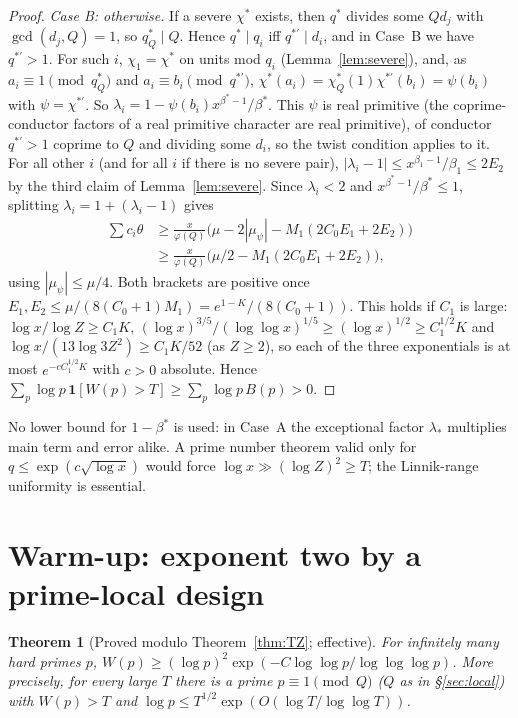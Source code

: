 \documentclass[11pt,reqno]{amsart}
\newtheorem{theorem}{Theorem}[section]
\theoremstyle{definition}
\begin{document}
\begin{proof}
\emph{Case B: otherwise.}  If a severe $\chi^*$ exists, then $q^*$ divides some
$Qd_j$ with $\gcd(d_j,Q)=1$, so $q^*_Q\mid Q$.  Hence $q^*\mid q_i$ iff
$q^{*\prime}\mid d_i$, and in Case~B we have $q^{*\prime}>1$.  For such $i$,
$\chi_1=\chi^*$ on units mod $q_i$ (Lemma~\ref{lem:severe}), and, as
$a_i\equiv1\pmod{q^*_Q}$ and $a_i\equiv b_i\pmod{q^{*\prime}}$,
$\chi^*(a_i)=\chi^*_Q(1)\chi^{*\prime}(b_i)=\psi(b_i)$ with $\psi=\chi^{*\prime}$.  So
$\lambda_i=1-\psi(b_i)x^{\beta^*-1}/\beta^*$.  This $\psi$ is real primitive (the
coprime-conductor factors of a real primitive character are real primitive), of
conductor $q^{*\prime}>1$ coprime to $Q$ and dividing some $d_i$, so the twist
condition applies to it.  For all other $i$ (and for all $i$ if there is no
severe pair), $|\lambda_i-1|\le x^{\beta_1-1}/\beta_1\le2E_2$ by the third claim of
Lemma~\ref{lem:severe}.  Since $\lambda_i<2$ and
$x^{\beta^*-1}/\beta^*\le1$, splitting $\lambda_i=1+(\lambda_i-1)$ gives
\begin{align*}
 \sum c_i\theta&\ge\frac{x}{\varphi(Q)}\big(\mu-2|\mu_\psi|-M_1(2C_0E_1+2E_2)\big)\\
 &\ge\frac{x}{\varphi(Q)}\big(\mu/2-M_1(2C_0E_1+2E_2)\big),
\end{align*}
using $|\mu_\psi|\le\mu/4$.  Both brackets are positive once
$E_1,E_2\le\mu/(8(C_0+1)M_1)=e^{1-K}/(8(C_0+1))$.  This holds if $C_1$ is large:
$\log x/\log Z\ge C_1K$, $(\log x)^{3/5}/(\log\log x)^{1/5}\ge(\log x)^{1/2}\ge
C_1^{1/2}K$ and $\log x/(13\log3Z^2)\ge C_1K/52$ (as $Z\ge2$), so each of the
three exponentials is at most $e^{-cC_1^{1/2}K}$ with $c>0$ absolute.  Hence
$\sum_p\log p\,\mathbf 1[W(p)>T]\ge\sum_p\log p\,B(p)>0$.
\end{proof}

No lower bound for $1-\beta^*$ is used: in Case~A the exceptional factor
$\lambda_*$ multiplies main term and error alike.  A prime number theorem
valid only for $q\le\exp(c\sqrt{\log x})$ would force $\log x\gg(\log Z)^2\ge T$;
the Linnik-range uniformity is essential.

\section{Warm-up: exponent two by a prime-local design}\label{sec:proof}

\begin{theorem}[Proved modulo Theorem~\ref{thm:TZ}; effective]\label{thm:two}
For infinitely many hard primes $p$,
$W(p)\ge(\log p)^2\exp(-C\log\log p/\log\log\log p)$.  More precisely, for
every large $T$ there is a prime $p\equiv1\pmod Q$ \textup{(}$Q$ as in
\S\ref{sec:local}\textup{)} with $W(p)>T$ and
$\log p\le T^{1/2}\exp(O(\log T/\log\log T))$.
\end{theorem}
\end{document}
